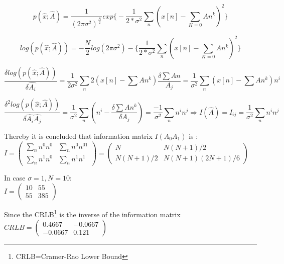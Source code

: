 \begin{equation}
    p(\hat{x};\hat{A})=\frac{1}{(2\pi\sigma^2)^{\frac{N}{2}}}exp\bigg\{-\frac{1}{2*\sigma^2}\sum_{n}(x[n]-\sum_{K=0}An^{k})^2\bigg\}
\end{equation}

\begin{equation}
    log(p(\hat{x};\hat{A}))=-\frac{N}{2}log(2\pi\sigma^2)-\bigg\{\frac{1}{2*\sigma^2}\sum_{n}(x[n]-\sum_{K=0}An^{k})^2\bigg\}
\end{equation}

\begin{equation}
   \frac{\delta log(p(\hat{x};\hat{A}))}{\delta \hat{A_{i}}} =\frac{1}{2\sigma^2}\sum_{n}2(x[n]-\sum An^{k})\frac{\delta \sum An}{A_{j}}=\frac{1}{\sigma^2}\sum_{n}(x[n]-\sum An^{k})n^{i}
\end{equation}

\begin{equation}
   \frac{\delta^2 log(p(\hat{x};\hat{A}))}{\delta \hat{A_{i}}\hat{A_{j}}} =\frac{1}{\sigma^2}\sum_{n}(n^{i}-\frac{\delta\sum An^{k}}{\delta A_{j}})=\frac{-1}{\sigma^2}\sum_{n}n^{i}n^{j}\Longrightarrow I(\hat{A})=I_{ij}=\frac{1}{\sigma^2}\sum_{n}n^{i}n^{j}
\end{equation}

Thereby it is concluded that information matrix $I(A_{0}A_{1})$ is :\\

$I = 
 \begin{pmatrix}
  \sum_n n^{0}n^{0} &  \sum_n n^{0}n^{01} \\
  \sum_n n^{1}n^{0} &  \sum_n n^{1}n^{1} 
 \end{pmatrix}
 = 
 \begin{pmatrix}
  N&  N(N+1)/2 \\
  N(N+1)/2 &  N(N+1)(2N+1)/6 
 \end{pmatrix}$


In case $\sigma=1,N=10$:\\

$I = 
 \begin{pmatrix}
 10&55 \\
  55&385 
 \end{pmatrix}$
 
 Since the CRLB\footnote{CRLB=Cramer-Rao Lower Bound} is the inverse of the information  matrix
$CRLB=
 \begin{pmatrix}
  0.4667&-0.0667 \\
  -0.0667&0.121 
 \end{pmatrix}$

